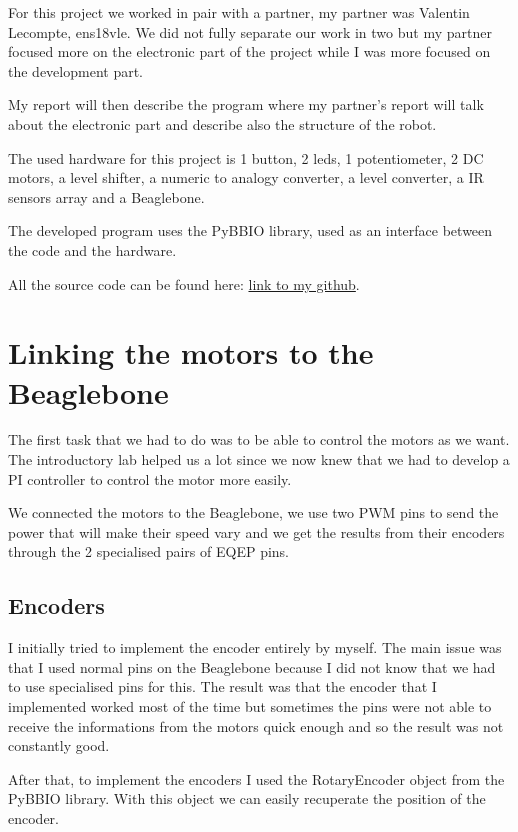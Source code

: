 For this project we worked in pair with a partner, my partner was Valentin Lecompte, ens18vle.
We did not fully separate our work in two but my partner focused more on the electronic part of the project while I was more focused on the development part. 

My report will then describe the program where my partner's report will talk about the electronic part and describe also the structure of the robot.

The used hardware for this project is 1 button, 2 leds, 1 potentiometer, 2 DC motors, a level shifter, a numeric to analogy converter, a level converter, a IR sensors array and a Beaglebone.

The developed program uses the PyBBIO library, used as an interface between the code and the hardware.

All the source code can be found here: \href{http://github.com/ThomasRanvier/line_following_robot}{link to my github}.

\section*{Linking the motors to the Beaglebone}

The first task that we had to do was to be able to control the motors as we want.
The introductory lab helped us a lot since we now knew that we had to develop a PI controller to control the motor more easily.

We connected the motors to the Beaglebone, we use two PWM pins to send the power that will make their speed vary and we get the results from their encoders through the 2 specialised pairs of EQEP pins.

\subsection*{Encoders}

I initially tried to implement the encoder entirely by myself.
The main issue was that I used normal pins on the Beaglebone because I did not know that we had to use specialised pins for this.
The result was that the encoder that I implemented worked most of the time but sometimes the pins were not able to receive the informations from the motors quick enough and so the result was not constantly good.

After that, to implement the encoders I used the RotaryEncoder object from the PyBBIO library.
With this object we can easily recuperate the position of the encoder.

